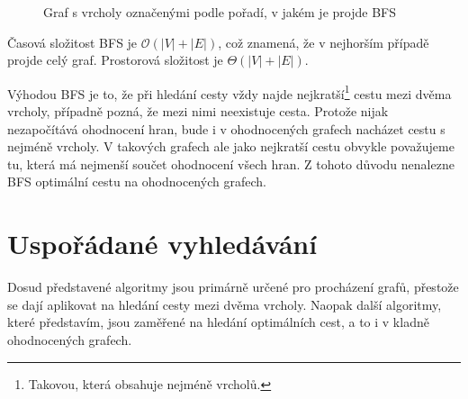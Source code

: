 \documentclass[12pt]{report}			%
\begin{document}
\begin{figure}[h]
\begin{center}
\caption{Graf s vrcholy označenými podle pořadí, v jakém je projde BFS} \label{grafBFS}
\end{center}
\end{figure}
Časová složitost BFS je $\mathcal{O}(|V| + |E|)$, což znamená, že v nejhorším případě projde celý graf. Prostorová složitost je $\Theta(|V| + |E|)$.

Výhodou BFS je to, že při hledání cesty vždy najde nejkratší\footnote{Takovou, která obsahuje nejméně vrcholů.} cestu mezi dvěma vrcholy, případně pozná, že mezi nimi neexistuje cesta. Protože nijak nezapočítává ohodnocení hran, bude i v ohodnocených grafech nacházet cestu s nejméně vrcholy. V takových grafech ale jako nejkratší cestu obvykle považujeme tu, která má nejmenší součet ohodnocení všech hran. Z tohoto důvodu nenalezne BFS optimální cestu na ohodnocených grafech.

		
			\section{Uspořádané vyhledávání}
			Dosud představené algoritmy jsou primárně určené pro procházení grafů, přestože se dají aplikovat na hledání cesty mezi dvěma vrcholy.
			Naopak další algoritmy, které představím, jsou zaměřené na hledání optimálních cest, a to i v kladně ohodnocených grafech.
			
			
\end{document}
